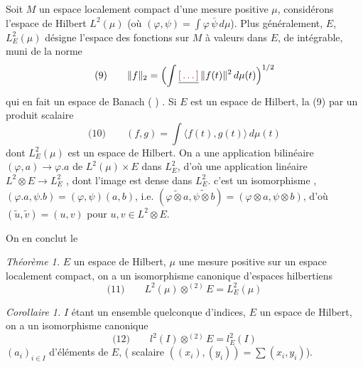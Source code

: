 \documentclass[11pt,a4paper]{article}
\begin{document}
  Soit $M$ un espace localement compact  d'une mesure positive $\mu$, considérons l'espace de Hilbert $L^{2}(\mu)$ (où $(\varphi, \psi) = \int \varphi\,\bar{\psi}\, d\mu$). Plus généralement, \ill{} \ill{}  $E$, $L^{2}_{E}(\mu)$ désigne l'espace des fonctions sur $M$ à valeurs dans $E$, de \ill{} \ill{} intégrable, muni de la norme
\[
  \text{(9)}\qquad \|f\|_2 = \Bigl(\int \struck{\ill{}}\, \|f(t)\|^{2}\, d\mu(t)\Bigr)^{1/2}
\]
qui en fait un espace de Banach ( ) . Si $E$ est un espace de Hilbert, la  (9)     par un produit scalaire
\[
  \text{(10)}\qquad (f, g) = \int \langle f(t), g(t)\rangle\, d\mu(t)
\]
dont $L^{2}_{E}(\mu)$ est  un espace de Hilbert. On a une application bilinéaire  $(\varphi, a) \to \varphi.a$ de $L^{2}(\mu) \times E$ dans $L^{2}_{E}$, d'où une application linéaire $L^{2} \otimes E \to L^{2}_{E}$ , dont l'image est  dense dans $L^{2}_{E}$. \struck{\ill{}} c'est un isomorphisme      , $(\varphi.a, \psi.b) = (\varphi, \psi)(a, b)$, i.e. $(\widetilde{\varphi \otimes a}, \widetilde{\psi \otimes b}) = (\varphi \otimes a, \psi \otimes b)$, d'où   $(\tilde{u}, \tilde{v}) = (u, v)$ pour  $u, v \in L^{2} \otimes E$.

On en conclut le

\emph{Théorème 1.}  $E$  un espace de Hilbert,  $\mu$ une mesure positive sur un  espace localement compact, on a un isomorphisme canonique d'espaces hilbertiens
\[
  \text{(11)}\qquad L^{2}(\mu) \otimes^{(2)} E = L^{2}_{E}(\mu)
\]

\emph{Corollaire 1.} $I$ étant un ensemble quelconque d'indices, $E$ un espace de Hilbert, on a un isomorphisme canonique
\[
  \text{(12)}\qquad l^{2}(I) \otimes^{(2)} E = l^{2}_{E}(I)
\]
      \struck{\ill{}}    $(a_i)_{i \in I}$ d'éléments de $E$, \struck{\ill{}} ( \struck{\ill{}}  scalaire $((x_i), (y_i)) = \sum (x_i, y_i)$).
\end{document}
